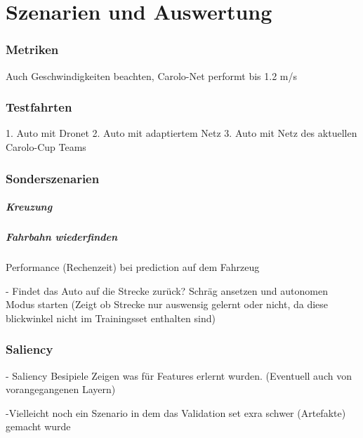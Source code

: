 %
\chapter{Szenarien und Auswertung}

\subsection{Metriken}


Auch Geschwindigkeiten beachten, Carolo-Net performt bis 1.2 m/s
\subsection{Testfahrten}

1. Auto mit Dronet 
2. Auto mit adaptiertem Netz
3. Auto mit Netz des aktuellen Carolo-Cup Teams 

\subsection{Sonderszenarien}

\paragraph{Kreuzung}

\paragraph{Fahrbahn wiederfinden}

Performance (Rechenzeit) bei prediction auf dem Fahrzeug


- Findet das Auto auf die Strecke zurück? Schräg ansetzen und autonomen Modus starten
(Zeigt ob Strecke nur auswensig gelernt oder nicht, da  diese blickwinkel nicht im Trainingsset enthalten sind)

\subsection{Saliency}
- Saliency Besipiele Zeigen was für Features erlernt wurden. (Eventuell auch von vorangegangenen Layern)

-Vielleicht noch ein Szenario in dem das Validation set exra schwer (Artefakte) gemacht wurde

